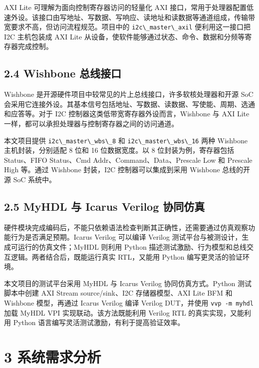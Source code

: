 AXI Lite 可理解为面向控制寄存器访问的轻量化 AXI
接口，常用于处理器配置低速外设。该接口由写地址、写数据、写响应、读地址和读数据等通道组成，传输带宽要求不高，但访问流程规范。项目中的
\passthrough{\lstinline!i2c\_master\_axil!} 便利用这一接口把 I2C
主机包装成 AXI Lite
从设备，使软件能够通过状态、命令、数据和分频等寄存器完成控制。

\subsection{2.4 Wishbone
总线接口}\label{wishbone-ux603bux7ebfux63a5ux53e3}

Wishbone 是开源硬件项目中较常见的片上总线接口，许多软核处理器和开源 SoC
会采用它连接外设。其基本信号包括地址、写数据、读数据、写使能、周期、选通和应答等。对于
I2C 控制器这类低带宽寄存器外设而言，Wishbone 与 AXI Lite
一样，都可以承担处理器与控制寄存器之间的访问通道。

本文项目提供 \passthrough{\lstinline!i2c\_master\_wbs\_8!} 和
\passthrough{\lstinline!i2c\_master\_wbs\_16!} 两种 Wishbone
主机封装，分别适配 8 位和 16 位数据宽度。以 8 位封装为例，寄存器包括
Status、FIFO Status、Cmd Addr、Command、Data、Prescale Low 和 Prescale
High 等。通过 Wishbone 封装，I2C 控制器可以集成到采用 Wishbone
总线的开源 SoC 系统中。

\subsection{2.5 MyHDL 与 Icarus Verilog
协同仿真}\label{myhdl-ux4e0e-icarus-verilog-ux534fux540cux4effux771f}

硬件模块完成编码后，不能只依赖语法检查判断其正确性，还需要通过仿真观察功能行为是否满足预期。Icarus
Verilog 可以编译 Verilog 测试平台与被测设计，生成可运行的仿真文件；MyHDL
则利用 Python
描述测试激励、行为模型和总线交互逻辑。两者结合后，既能运行真实
RTL，又能用 Python 编写更灵活的验证环境。

本文项目的测试平台采用 MyHDL 与 Icarus Verilog 协同仿真方式。Python
测试脚本中创建 AXI Stream source/sink、I2C 存储器模型、AXI Lite BFM 和
Wishbone 模型，再通过 Icarus Verilog 编译 Verilog DUT，并使用
\passthrough{\lstinline!vvp -m myhdl!} 加载 MyHDL VPI
实现联动。该方法既能利用 Verilog RTL 的真实实现，又能利用 Python
语言编写灵活测试激励，有利于提高验证效率。

\section{3 系统需求分析}\label{ux7cfbux7edfux9700ux6c42ux5206ux6790}

